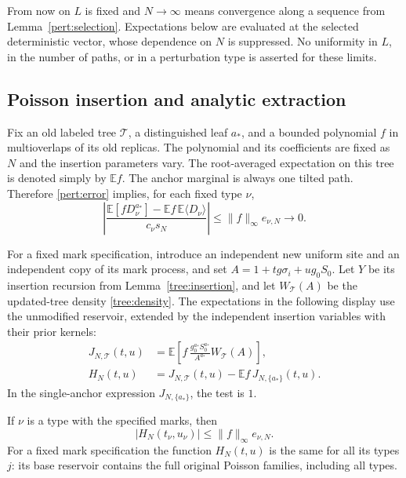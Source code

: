 From now on $L$ is fixed and $N\to\infty$ means convergence along a
sequence from Lemma~\ref{pert:selection}. Expectations below are evaluated at
the selected deterministic vector, whose dependence on $N$ is
suppressed.  No uniformity in $L$, in the number of paths, or in a
perturbation type is asserted for these limits.

\subsection{Poisson insertion and analytic extraction}

Fix an old labeled tree $\mathcal T$, a distinguished leaf $a_*$, and
a bounded polynomial $f$ in multioverlaps of its old replicas.  The
polynomial and its coefficients are fixed as $N$ and the insertion
parameters vary. The
root-averaged expectation on this tree is denoted simply by
$\mathbb E f$.  The anchor marginal is always one tilted path.
Therefore \eqref{pert:error} implies, for each fixed type $\nu$,
\begin{equation}
 \left|\frac{\mathbb E[fD_\nu^{a_*}]
       -\mathbb E f\,\mathbb E\langle D_\nu\rangle}
       {c_\nu s_N}\right|
 \leq\|f\|_\infty e_{\nu,N}\longrightarrow0.
 \label{pert:score-identity}
\end{equation}

For a fixed mark specification, introduce an independent new uniform
site and an independent copy of its mark process, and set
$A=1+tg\sigma_i+ug_0S_0$.  Let $Y$ be its insertion recursion from
Lemma~\ref{tree:insertion}, and let $W_{\mathcal T}(A)$ be the updated-tree
density \eqref{tree:density}. The expectations in the following display use
the unmodified reservoir, extended by the independent insertion
variables with their prior kernels:
\begin{align}
 J_{N,\mathcal T}(t,u)
 &=\mathbb E\left[
 f\,\frac{g_0^{a_*}S_0^{a_*}}{A^{a_*}}
          W_{\mathcal T}(A)\right],\label{pert:palm-expression}\\
 H_N(t,u)
 &=J_{N,\mathcal T}(t,u)
   -\mathbb E f\,J_{N,\{a_*\}}(t,u).
 \label{pert:analytic-difference}
\end{align}
In the single-anchor expression $J_{N,\{a_*\}}$, the test is $1$.

\begin{lemma}
\label{pert:palm}
If $\nu$ is a type with the specified marks, then
\begin{equation}
 |H_N(t_\nu,u_\nu)|\leq\|f\|_\infty e_{\nu,N}.
 \label{pert:palm-bound}
\end{equation}
For a fixed mark specification the function $H_N(t,u)$ is the same
for all its types $j$: its base reservoir contains the full original
Poisson families, including all types.
\end{lemma}

